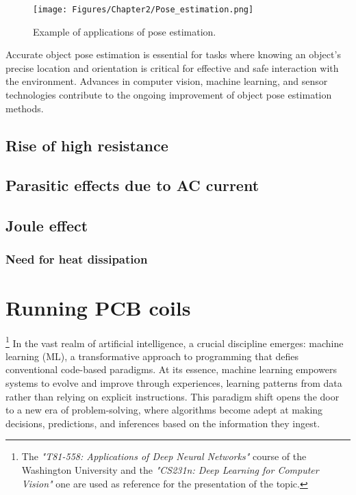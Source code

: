 \begin{figure}[th]
    \centering
    \texttt{[image: Figures/Chapter2/Pose\_estimation.png]}
    \caption[Example of applications of pose estimation.]{Example of applications of pose estimation.}
    \label{fig:PoseEstimation}
\end{figure}

Accurate object pose estimation is essential for tasks where knowing an object's precise location and orientation is critical for effective and safe interaction with the environment. Advances in computer vision, machine learning, and sensor technologies contribute to the ongoing improvement of object pose estimation methods.


\subsection{Rise of high resistance}

\subsection{Parasitic effects due to AC current}

\subsection{Joule effect}

\subsubsection{Need for heat dissipation}

\newpage
\section{Running PCB coils}\footnote{The \textit{"T81-558: Applications of Deep Neural Networks"} course of the Washington University \cite{T81-558} and the \textit{"CS231n: Deep Learning for Computer Vision"}\cite{CS231n} one are used as reference for the presentation of the topic.}
In the vast realm of artificial intelligence, a crucial discipline emerges: machine learning (ML), a transformative approach to programming that defies conventional code-based paradigms. At its essence, machine learning empowers systems to evolve and improve through experiences, learning patterns from data rather than relying on explicit instructions. This paradigm shift opens the door to a new era of problem-solving, where algorithms become adept at making decisions, predictions, and inferences based on the information they ingest.

